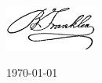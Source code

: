 \begin{frame}[plain]
    \begin{minipage}[t]{0.65\textwidth}
        \vspace{0pt}
        {\Huge\bfseries \myTitle \par}
    \end{minipage}%
    \begin{minipage}[t]{0.34\textwidth}
        \vspace{0pt}
        \raggedleft
        \includegraphics[height=1.5cm]{images/logo.png}
    \end{minipage}

    \vspace{1.2cm}

    \begin{flushleft}
        {\large \myAuthor  \par}
        \vspace{0.5cm}
        {\normalsize \myFaculty \par}
        {\normalsize \myUniversity \par}
        \vspace{0.5cm}
        {\normalsize \today \par}
    \end{flushleft}
\end{frame}

